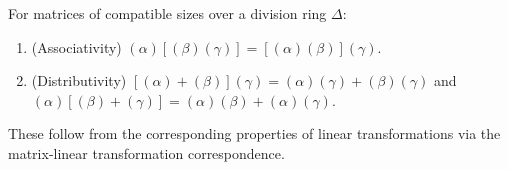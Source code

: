 For matrices of compatible sizes over a division ring $\Delta$:
\begin{enumerate}
\item (Associativity) $(\alpha)[(\beta)(\gamma)] = [(\alpha)(\beta)](\gamma)$.
\item (Distributivity) $[(\alpha) + (\beta)](\gamma) = (\alpha)(\gamma) + (\beta)(\gamma)$ and $(\alpha)[(\beta) + (\gamma)] = (\alpha)(\beta) + (\alpha)(\gamma)$.
\end{enumerate}
These follow from the corresponding properties of linear transformations via the matrix-linear transformation correspondence.
